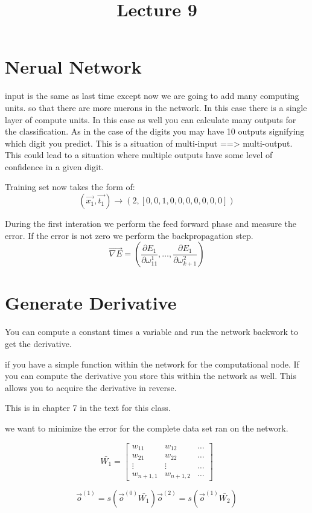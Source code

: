 \documentclass[letter, 9pt]{article}
\title{Lecture 9}
\begin{document}
\maketitle
\section{Nerual Network}

input is the same as last time except now we are going to add many computing units. so that there are more nuerons in the network. In this case there is a single layer of compute units. In this case as well you can calculate many outputs for the classification. As in the case of the digits you may have 10 outputs signifying which digit you predict. This is a situation of multi-input ==> multi-output. This could lead to a situation where multiple outputs have some level of confidence in a given digit.

Training set now takes the form of:
\begin{equation}
(\vec{x_1}, \vec{t_1}) \rightarrow (2, [0, 0, 1, 0, 0, 0, 0, 0, 0, 0])
\end{equation}

During the first interation we perform the feed forward phase and measure the error. If the error is not zero we perform the backpropagation step.
\begin{equation}
\vec{\nabla E} = (\frac{\partial E_1}{\partial \omega_{11}^1}, \dots, \frac{\partial E_1}{\partial \omega_{k+1}^2})
\end{equation}

\section{Generate Derivative}

You can compute a constant times a variable and run the network backwork to get the derivative.

if you have a simple function within the network for the computational node. If you can compute the derivative you store this within the network as well. This allows you to acquire the derivative in reverse.

This is in chapter 7 in the text for this class.


we want to minimize the error for the complete data set ran on the network.

\begin{equation}
\bar{W_1} = 
\begin{bmatrix}
w_{11} & w_{12} & \dots \\
w_{21} & w_{22} & \dots \\
\vdots & \vdots & \dots \\
w_{n+1, 1} & w_{n+1, 2} & \dots
\end{bmatrix}
\end{equation}

\begin{equation}
\vec{o}^{(1)} = s(\vec{o}^{(0)} \bar{W_1})
\vec{o}^{(2)} = s(\vec{o}^{(1)} \bar{W_2})
\end{equation}
\end{document}
